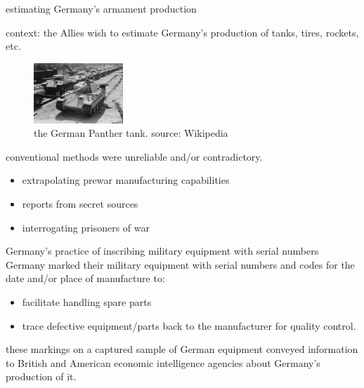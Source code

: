 \documentclass[10pt]{beamer}
\begin{document}
\begin{frame}[t]{estimating Germany's armament production}

	\alert{context:} the Allies wish to estimate Germany's production of tanks, tires, rockets, etc. 
	
	\begin{figure}
		\centering
		\includegraphics[width=0.3\textwidth]{panther_tank.jpg}
		\caption{the German Panther tank. source: Wikipedia}
	\end{figure}

	\pause
	
	conventional methods were unreliable and/or contradictory.
	\begin{itemize}
		\item extrapolating prewar manufacturing capabilities
		\item reports from secret sources
		\item interrogating prisoners of war
	\end{itemize}
	
	\vspace{\baselineskip}
\end{frame}

\begin{frame}[t]{Germany's practice of inscribing military equipment with serial numbers}
	Germany marked their military equipment with serial numbers and codes for the date and/or place of manufacture to:
	\begin{itemize}
		\item facilitate handling spare parts
		\item trace defective equipment/parts back to the manufacturer for quality control.
	\end{itemize}
	
	\pause 
	
	 these markings on a captured sample of German equipment conveyed information to British and American economic intelligence agencies about Germany's production of it.
\end{frame}
\end{document}
